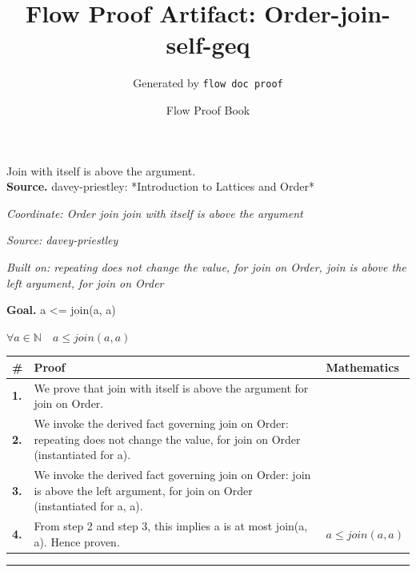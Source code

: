 \documentclass[11pt]{article}
\title{Flow Proof Artifact: Order-join-self-geq}
\author{Generated by \texttt{flow doc proof}}
\date{Flow Proof Book}
\theoremstyle{definition}
\begin{document}
\maketitle
Join with itself is above the argument.\\[0.5em]
\textbf{Source.} davey-priestley: *Introduction to Lattices and Order*\\[0.5em]
\bigskip
{}\par
\smallskip\noindent\textit{Coordinate: Order \cdot join \cdot join with itself is above the argument}\par
\smallskip\noindent\textit{Source: davey-priestley}\par
\smallskip\noindent\textit{Built on: repeating does not change the value, for join on Order, join is above the left argument, for join on Order}\par
\medskip
\noindent\textbf{Goal.} a <= join(a, a)\par
\noindent$\displaystyle \forall a \in \mathbb{N}\quad a \le join(a, a)$\par
\medskip
\noindent
\begin{tabular}{@{} >{\raggedright\arraybackslash}p{} >{\raggedright\arraybackslash}p{} >{\raggedleft\arraybackslash}p{} @{}}
\textbf{\#} & \textbf{Proof} & \textbf{Mathematics} \\
\midrule
\textbf{1.} & We prove that join with itself is above the argument for join on Order. & \\[0.45em]
\textbf{2.} & We invoke the derived fact governing join on Order: repeating does not change the value, for join on Order (instantiated for a). & \\[0.45em]
\textbf{3.} & We invoke the derived fact governing join on Order: join is above the left argument, for join on Order (instantiated for a, a). & \\[0.45em]
\textbf{4.} & From step 2 and step 3, this implies a is at most join(a, a). Hence proven. & $\displaystyle a \le join(a, a)$ \\[0.45em]
\bottomrule
\end{tabular}
\label{thm:Order-join-join_with_itself_is_above_the_argument}
\par\medskip\hrule
\end{document}
